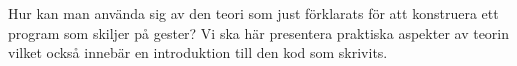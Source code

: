 \documentclass[../rapport_MVEX01-11-05]{subfiles}
\begin{document}
Hur kan man använda sig av den teori som just förklarats för att konstruera
ett program som skiljer på gester? Vi ska här presentera praktiska aspekter
av teorin vilket också innebär en introduktion till den kod som skrivits.
\end{document}
